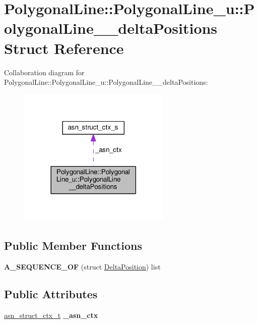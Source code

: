 \hypertarget{structPolygonalLine_1_1PolygonalLine__u_1_1PolygonalLine____deltaPositions}{}\section{Polygonal\+Line\+:\+:Polygonal\+Line\+\_\+u\+:\+:Polygonal\+Line\+\_\+\+\_\+delta\+Positions Struct Reference}
\label{structPolygonalLine_1_1PolygonalLine__u_1_1PolygonalLine____deltaPositions}


Collaboration diagram for Polygonal\+Line\+:\+:Polygonal\+Line\+\_\+u\+:\+:Polygonal\+Line\+\_\+\+\_\+delta\+Positions\+:\nopagebreak
\begin{figure}[H]
\begin{center}
\leavevmode
\includegraphics[width=206pt]{structPolygonalLine_1_1PolygonalLine__u_1_1PolygonalLine____deltaPositions__coll__graph}
\end{center}
\end{figure}
\subsection*{Public Member Functions}
\begin{DoxyCompactItemize}
\item 
{\bfseries A\+\_\+\+S\+E\+Q\+U\+E\+N\+C\+E\+\_\+\+OF} (struct \hyperlink{structDeltaPosition}{Delta\+Position}) list\hypertarget{structPolygonalLine_1_1PolygonalLine__u_1_1PolygonalLine____deltaPositions_a812dda6f39af41bb715f1fe5d3a27f8a}{}\label{structPolygonalLine_1_1PolygonalLine__u_1_1PolygonalLine____deltaPositions_a812dda6f39af41bb715f1fe5d3a27f8a}

\end{DoxyCompactItemize}
\subsection*{Public Attributes}
\begin{DoxyCompactItemize}
\item 
\hyperlink{structasn__struct__ctx__s}{asn\+\_\+struct\+\_\+ctx\+\_\+t} {\bfseries \+\_\+asn\+\_\+ctx}\hypertarget{structPolygonalLine_1_1PolygonalLine__u_1_1PolygonalLine____deltaPositions_a843b305a49ff0c1d5d0127d6d476f32c}{}\label{structPolygonalLine_1_1PolygonalLine__u_1_1PolygonalLine____deltaPositions_a843b305a49ff0c1d5d0127d6d476f32c}

\end{DoxyCompactItemize}


